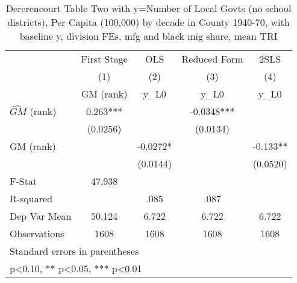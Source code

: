 \begin{table}[htbp]\centering
\def\sym#1{\ifmmode^{#1}\else\(^{#1}\)\fi}
\caption{Dererencourt Table Two with y=Number of Local Govts (no school districts), Per Capita (100,000) by decade in County 1940-70, with baseline y, division FEs, mfg and black mig share, mean TRI}
\begin{tabular}{l*{4}{c}}
\toprule
                    & First Stage   &         OLS   &Reduced Form   &        2SLS   \\
                    &\multicolumn{1}{c}{(1)}&\multicolumn{1}{c}{(2)}&\multicolumn{1}{c}{(3)}&\multicolumn{1}{c}{(4)}\\
                    &\multicolumn{1}{c}{GM  (rank)}&\multicolumn{1}{c}{y\_L0}&\multicolumn{1}{c}{y\_L0}&\multicolumn{1}{c}{y\_L0}\\
\midrule
$\hat{GM}$ (rank)   &       0.263***&               &     -0.0348***&               \\
                    &    (0.0256)   &               &    (0.0134)   &               \\
\addlinespace
GM  (rank)          &               &     -0.0272*  &               &      -0.133** \\
                    &               &    (0.0144)   &               &    (0.0520)   \\
\midrule
F-Stat              &      47.938   &               &               &               \\
R-squared           &               &        .085   &        .087   &               \\
Dep Var Mean        &      50.124   &       6.722   &       6.722   &       6.722   \\
Observations        &        1608   &        1608   &        1608   &        1608   \\
\bottomrule
\multicolumn{5}{l}{\footnotesize Standard errors in parentheses}\\
\multicolumn{5}{l}{\footnotesize * p<0.10, ** p<0.05, *** p<0.01}\\
\end{tabular}
\end{table}
